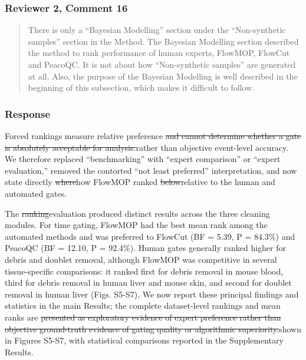 \documentclass[
  11pt,
  a4paper,
]{article}
\begin{document}
\subsubsection{Reviewer 2, Comment 16}\label{reviewer-2-comment-16}

\begin{quote}
There is only a ``Bayesian Modelling'' section under the ``Non-synthetic
samples'' section in the Method. The Bayesian Modelling section
described the method to rank performance of human experts, FlowMOP,
FlowCut and PeacoQC. It is not about how ``Non-synthetic samples'' are
generated at all. Also, the purpose of the Bayesian Modelling is well
described in the beginning of this subsection, which makes it difficult
to follow.
\end{quote}

\subsubsection{Response}\label{response-5}

Forced rankings measure relative preference
{\color{revisionred}\sout{and cannot determine whether a gate is
absolutely acceptable for analysis.}}{\color{revisionblue}rather than
objective event-level accuracy.} We therefore replaced ``benchmarking''
with ``expert comparison'' or ``expert evaluation,'' removed the
contorted ``not least preferred'' interpretation, and now state directly
{\color{revisionred}\sout{where}}{\color{revisionblue}how} FlowMOP
ranked {\color{revisionred}\sout{below}}{\color{revisionblue}relative
to} the human {\color{revisionblue}and automated} gates.

The {\color{revisionred}\sout{ranking}}{\color{revisionblue}evaluation
produced distinct} results {\color{revisionblue}across the three
cleaning modules. For time gating, FlowMOP had the best mean rank among
the automated methods and was preferred to FlowCut (BF = 5.39, P =
84.3\%) and PeacoQC (BF = 12.10, P = 92.4\%). Human gates generally
ranked higher for debris and doublet removal, although FlowMOP was
competitive in several tissue-specific comparisons: it ranked first for
debris removal in mouse blood, third for debris removal in human liver
and mouse skin, and second for doublet removal in human liver (Figs.
S5-S7). We now report these principal findings and statistics in the
main Results; the complete dataset-level rankings and mean ranks} are
{\color{revisionred}\sout{presented as exploratory evidence of expert
preference rather than objective ground-truth evidence of gating quality
or algorithmic superiority.}}{\color{revisionblue}shown in Figures
S5-S7, with statistical comparisons reported in the Supplementary
Results.}
\end{document}

